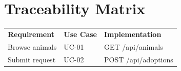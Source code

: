 \section{Traceability Matrix}

\begin{longtable}{p{4cm} p{4cm} p{4cm}}
\textbf{Requirement} & \textbf{Use Case} & \textbf{Implementation} \\
Browse animals & UC-01 & GET /api/animals \\
Submit request & UC-02 & POST /api/adoptions \\
\end{longtable}
